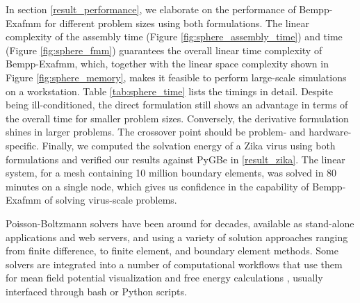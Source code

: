 In section \ref{result_performance}, we elaborate on the performance of Bempp-Exafmm for different problem sizes using both formulations.
The linear complexity of the assembly time (Figure \ref{fig:sphere_assembly_time}) and \fmm time (Figure \ref{fig:sphere_fmm}) guarantees the overall linear time complexity of Bempp-Exafmm, which, together with the linear space complexity shown in Figure \ref{fig:sphere_memory}, makes it feasible to perform large-scale simulations on a workstation.
Table \ref{tab:sphere_time} lists the timings in detail.
Despite being ill-conditioned, the direct formulation still shows an advantage in terms of the overall time for smaller problem sizes.
Conversely, the derivative formulation shines in larger problems.
The crossover point should be problem- and hardware-specific.
Finally, we computed the solvation energy of a Zika virus using both formulations and verified our results against PyGBe in \ref{result_zika}.
The linear system, for a mesh containing 10 million boundary elements, was solved in 80 minutes on a single node, which gives us confidence in the capability of Bempp-Exafmm of solving virus-scale problems.


Poisson-Boltzmann solvers
have been around for decades, available as stand-alone applications and web servers, and using a variety of solution approaches ranging from finite difference, to finite element, and boundary element methods.
Some solvers are integrated into a number of computational workflows that use them for mean field potential visualization \cite{HumphreyETal1996} and free energy calculations \cite{MillerETal2012,KumariETal2014,WangETal2018}, usually interfaced through bash or Python scripts.

